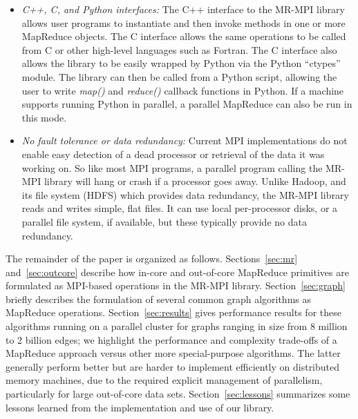 \begin{itemize}
\item {\it C++, C, and Python interfaces:} The C++ interface to the
MR-MPI library allows user programs to instantiate and then invoke
methods in one or more MapReduce objects.  The C interface allows the
same operations to be called from C or other high-level languages such
as Fortran.  The C interface also allows the library to be easily
wrapped by Python via the Python ``ctypes'' module.  The library can
then be called from a Python script, allowing the user to write {\it
map()} and {\it reduce()} callback functions in Python.  If a machine
supports running Python in parallel, a parallel MapReduce can also be
run in this mode.

\item {\it No fault tolerance or data redundancy:} Current MPI
implementations do not enable easy detection of a dead processor or
retrieval of the data it was working on.  So like most MPI programs, a
parallel program calling the MR-MPI library will hang or crash if a
processor goes away.  Unlike Hadoop, and its file system (HDFS) which
provides data redundancy, the MR-MPI library reads and writes simple,
flat files.  It can use local per-processor disks, or a parallel file
system, if available, but these typically provide no data redundancy.

\end{itemize}

The remainder of the paper is organized as follows.
Sections~\ref{sec:mr} and~\ref{sec:outcore} describe how in-core and
out-of-core MapReduce primitives are formulated as MPI-based
operations in the MR-MPI library.  Section~\ref{sec:graph} briefly
describes the formulation of several common graph algorithms as
MapReduce operations.  Section~\ref{sec:results} gives performance
results for these algorithms running on a parallel cluster for graphs
ranging in size from 8 million to 2 billion edges; we highlight the
performance and complexity trade-offs of a MapReduce approach versus
other more special-purpose algorithms.  The latter generally perform
better but are harder to implement efficiently on distributed memory
machines, due to the required explicit management of parallelism,
particularly for large out-of-core data sets.
Section~\ref{sec:lessons} summarizes some lessons learned from the
implementation and use of our library.

